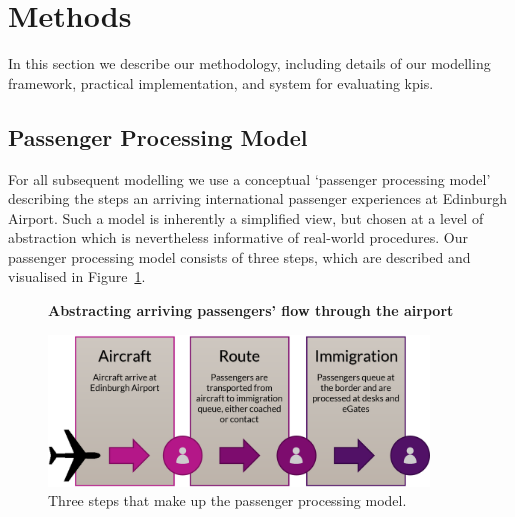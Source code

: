 \documentclass[10pt]{article}
\newcommand*{\figuretitle}[1]{%
    {\centering%
    \textbf{#1}%
    \par\medskip}%
}
\begin{document}
\section{Methods} \label{sec:methods}

In this section we describe our methodology, including details of our modelling framework, practical implementation, and system for evaluating \glspl{kpi}.

\subsection{Passenger Processing Model}

For all subsequent modelling we use a conceptual `passenger processing model' describing the steps an arriving international passenger experiences at Edinburgh Airport. Such a model is inherently a simplified view, but chosen at a level of abstraction which is nevertheless informative of real-world procedures. Our passenger processing model consists of three steps, which are described and visualised in Figure~\ref{fig:PPM_threesteps}.
  

\begin{figure}[!ht]
    \centering
    \figuretitle{Abstracting arriving passengers' flow through the airport}
    \includegraphics[width=0.9\textwidth]{figures/ThreeSteps.png}
     \caption{Three steps that make up the passenger processing model.} \label{fig:PPM_threesteps}
\end{figure}
\end{document}
